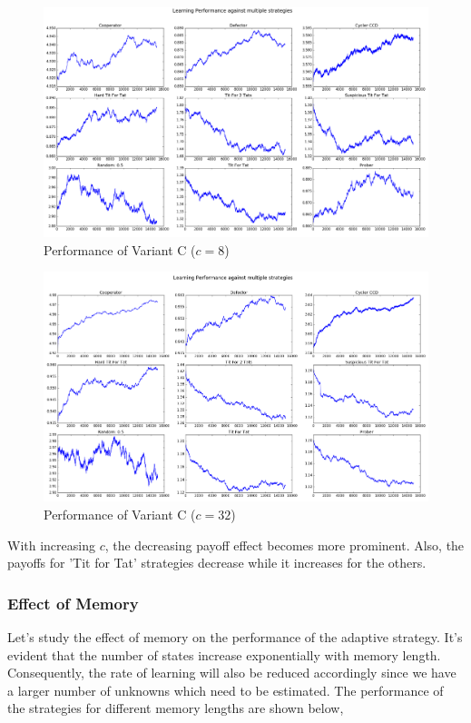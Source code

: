 \documentclass[a4paper]{article}
\begin{document}
	\begin{figure}[H]
	\centering
	\includegraphics[width=\textwidth]{learnerInitialC_b8.png}
	\caption*{{Performance of Variant C ($c = 8$)}}
	\end{figure}

	\begin{figure}[H]
	\centering
	\includegraphics[width=\textwidth]{learnerInitialC_b32.png}
	\caption*{{Performance of Variant C ($c = 32$)}}
	\end{figure}

	With increasing $c$, the decreasing payoff effect becomes more prominent. Also, the payoffs for 'Tit for Tat' strategies decrease while it increases for the others.

	\subsubsection{Effect of Memory}
	
	Let's study the effect of memory on the performance of the adaptive strategy. It's evident that the number of states increase exponentially with memory length.	Consequently, the rate of learning will also be reduced accordingly since we have a larger number of unknowns which need to be estimated. The performance of the strategies for different memory lengths are shown below,\\
	
\end{document}
